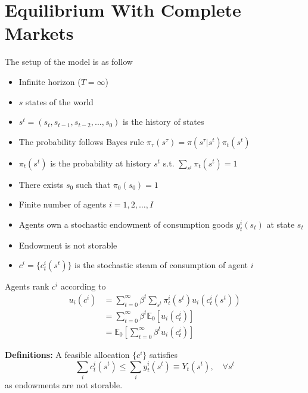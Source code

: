 \documentclass[twocolumn, fleqn]{article}
\numberwithin{equation}{section}
\begin{document}
	\section{Equilibrium With Complete Markets}
	The setup of the model is as follow
	\begin{itemize}
		\item Infinite horizon ($T=\infty$)
		\item $s$ states of the world
		\item $s^t = (s_t, s_{t-1}, s_{t-2}, \ldots, s_0)$ is the history of states
		\item The probability follows Bayes rule $\pi_\tau (s^\tau) = \pi(s^\tau |s^t)\pi_t (s^t)$
		\item $\pi_t (s^t)$ is the probability at history $s^t$ s.t. $\sum_{s^t}\pi_t (s^t)=1$
		\item There exists $s_0$ such that $\pi_0 (s_0)=1$
		\item Finite number of agents $i = 1,2, \ldots, I$
		\item Agents own a stochastic endowment of consumption goods $y_t^i(s_t)$ at state $s_t$
		\item Endowment is not storable
		\item $c^i = \{ c_t^i(s^t) \}$ is the stochastic steam of consumption of agent $i$
	\end{itemize}
	Agents rank $c^i$ according to 
	\begin{align*}
		u_i(c^i) &= \sum_{t=0}^{\infty} \beta^t \sum_{s^t} \pi_t^i (s^t)u_i(c_t^i (s^t))\\
		&= \sum_{t=0}^{\infty} \beta^t \mathbb E_0 [u_i(c_t^i)]\\
		&= \mathbb E_0 \left[ \sum_{t=0}^{\infty} \beta^t u_i(c_t^i)\right]
	\end{align*}
	
	\textbf{Definitions:} A feasible allocation $\{ c^i\}$ satisfies
	\[\sum_i c_t^i(s^t) \leq \sum_i y_t^i(s^t) \equiv Y_t (s^t), \quad \forall s^t \]
	as endowments are not storable. 
\end{document}
